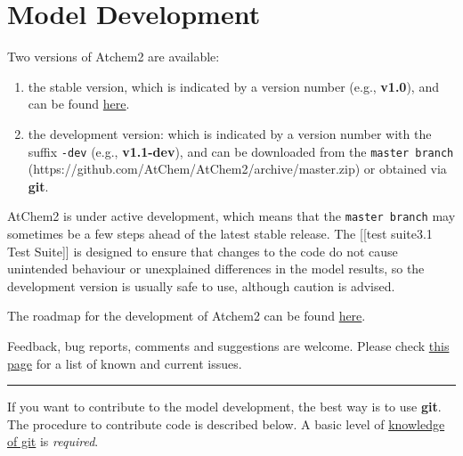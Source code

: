 \chapter{Model Development}

Two versions of Atchem2 are available:

\begin{enumerate}
\def\labelenumi{\arabic{enumi})}
\item
  the stable version, which is indicated by a version number (e.g.,
  \textbf{v1.0}), and can be found
  \href{https://github.com/AtChem/AtChem2/releases}{here}.
\item
  the development version: which is indicated by a version number with
  the suffix \texttt{-dev} (e.g., \textbf{v1.1-dev}), and can be
  downloaded from the \texttt{master\ branch}
  (https://github.com/AtChem/AtChem2/archive/master.zip) or obtained via
  \textbf{git}.
\end{enumerate}

AtChem2 is under active development, which means that the
\texttt{master\ branch} may sometimes be a few steps ahead of the latest
stable release. The {[}{[}test suite\textbar{}3.1 Test Suite{]}{]} is
designed to ensure that changes to the code do not cause unintended
behaviour or unexplained differences in the model results, so the
development version is usually safe to use, although caution is advised.

The roadmap for the development of Atchem2 can be found
\href{https://github.com/AtChem/AtChem2/projects/1}{here}.

Feedback, bug reports, comments and suggestions are welcome. Please
check \href{https://github.com/AtChem/AtChem2/issues}{this page} for a
list of known and current issues.

\begin{center}\rule{0.5\linewidth}{\linethickness}\end{center}

If you want to contribute to the model development, the best way is to
use \textbf{git}. The procedure to contribute code is described below. A
basic level of
\href{https://swcarpentry.github.io/git-novice/}{knowledge of git} is
\emph{required}.


